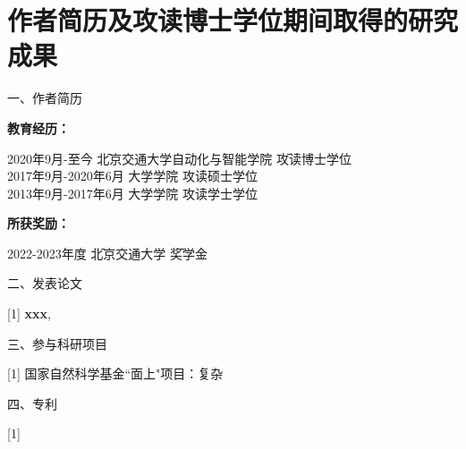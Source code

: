 \chapter{作者简历及攻读博士学位期间取得的研究成果}
\setlength{\parindent}{0pt}


一、作者简历

\songti\textbf{教育经历：}  

\vspace{-0.7\baselineskip} %

\begin{tabbing}
    2020年9月-至今 \hspace{2cm} \= 北京交通大学自动化与智能学院 \hspace{2cm} \= 攻读博士学位 \\
    2017年9月-2020年6月 \> 大学学院 \> 攻读硕士学位 \\
    2013年9月-2017年6月 \> 大学学院 \> 攻读学士学位 \\
\end{tabbing}
\vspace{-1.2\baselineskip} %
    
\songti\textbf{所获奖励：}
\vspace{-0.6\baselineskip} %
\begin{tabbing}
    2022-2023年度 \hspace{1cm} \=  北京交通大学 \hspace{2.8cm} \= 奖学金 \\
\end{tabbing}
\vspace{-0.7\baselineskip} %


二、发表论文

[1] \textbf{xxx}, 




\vspace{10pt}
三、参与科研项目

[1] 国家自然科学基金``面上"项目：复杂


\vspace{10pt}



四、专利

[1] 





%
%
%
%
   


